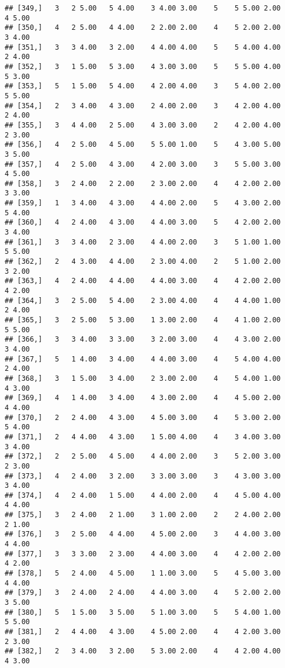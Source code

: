 \documentclass[]{article}
\begin{document}
\begin{verbatim}
## [349,]   3   2 5.00   5 4.00    3 4.00 3.00    5    5 5.00 2.00    4 5.00
## [350,]   4   2 5.00   4 4.00    2 2.00 2.00    4    5 2.00 2.00    3 4.00
## [351,]   3   3 4.00   3 2.00    4 4.00 4.00    5    5 4.00 4.00    2 4.00
## [352,]   3   1 5.00   5 3.00    4 3.00 3.00    5    5 5.00 4.00    5 3.00
## [353,]   5   1 5.00   5 4.00    4 2.00 4.00    3    5 4.00 2.00    5 5.00
## [354,]   2   3 4.00   4 3.00    2 4.00 2.00    3    4 2.00 4.00    2 4.00
## [355,]   3   4 4.00   2 5.00    4 3.00 3.00    2    4 2.00 4.00    2 3.00
## [356,]   4   2 5.00   4 5.00    5 5.00 1.00    5    4 3.00 5.00    3 5.00
## [357,]   4   2 5.00   4 3.00    4 2.00 3.00    3    5 5.00 3.00    4 5.00
## [358,]   3   2 4.00   2 2.00    2 3.00 2.00    4    4 2.00 2.00    3 3.00
## [359,]   1   3 4.00   4 3.00    4 4.00 2.00    5    4 3.00 2.00    5 4.00
## [360,]   4   2 4.00   4 3.00    4 4.00 3.00    5    4 2.00 2.00    3 4.00
## [361,]   3   3 4.00   2 3.00    4 4.00 2.00    3    5 1.00 1.00    5 5.00
## [362,]   2   4 3.00   4 4.00    2 3.00 4.00    2    5 1.00 2.00    3 2.00
## [363,]   4   2 4.00   4 4.00    4 4.00 3.00    4    4 2.00 2.00    4 2.00
## [364,]   3   2 5.00   5 4.00    2 3.00 4.00    4    4 4.00 1.00    2 4.00
## [365,]   3   2 5.00   5 3.00    1 3.00 2.00    4    4 1.00 2.00    5 5.00
## [366,]   3   3 4.00   3 3.00    3 2.00 3.00    4    4 3.00 2.00    3 4.00
## [367,]   5   1 4.00   3 4.00    4 4.00 3.00    4    5 4.00 4.00    2 4.00
## [368,]   3   1 5.00   3 4.00    2 3.00 2.00    4    5 4.00 1.00    4 3.00
## [369,]   4   1 4.00   3 4.00    4 3.00 2.00    4    4 5.00 2.00    4 4.00
## [370,]   2   2 4.00   4 3.00    4 5.00 3.00    4    5 3.00 2.00    5 4.00
## [371,]   2   4 4.00   4 3.00    1 5.00 4.00    4    3 4.00 3.00    3 4.00
## [372,]   2   2 5.00   4 5.00    4 4.00 2.00    3    5 2.00 3.00    2 3.00
## [373,]   4   2 4.00   3 2.00    3 3.00 3.00    3    4 3.00 3.00    3 4.00
## [374,]   4   2 4.00   1 5.00    4 4.00 2.00    4    4 5.00 4.00    4 4.00
## [375,]   3   2 4.00   2 1.00    3 1.00 2.00    2    2 4.00 2.00    2 1.00
## [376,]   3   2 5.00   4 4.00    4 5.00 2.00    3    4 4.00 3.00    4 4.00
## [377,]   3   3 3.00   2 3.00    4 4.00 3.00    4    4 2.00 2.00    4 2.00
## [378,]   5   2 4.00   4 5.00    1 1.00 3.00    5    4 5.00 3.00    4 4.00
## [379,]   3   2 4.00   2 4.00    4 4.00 3.00    4    5 2.00 2.00    3 5.00
## [380,]   5   1 5.00   3 5.00    5 1.00 3.00    5    5 4.00 1.00    5 5.00
## [381,]   2   4 4.00   4 3.00    4 5.00 2.00    4    4 2.00 3.00    2 3.00
## [382,]   2   3 4.00   3 2.00    5 3.00 2.00    4    4 2.00 4.00    4 3.00

\end{verbatim}
\end{document}
